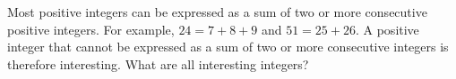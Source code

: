 \begin{problem} [\cite{104NT}/ 3.3]

   Most positive integers can be expressed as a sum of two or more 
   consecutive positive integers. For example, $24=7+8+9$ and 
   $51=25+26$. A positive integer that cannot be expressed as a 
   sum of two or more consecutive integers is therefore 
   interesting. What are all interesting integers? 
    \label{[1]3.3}
\end{problem}
    